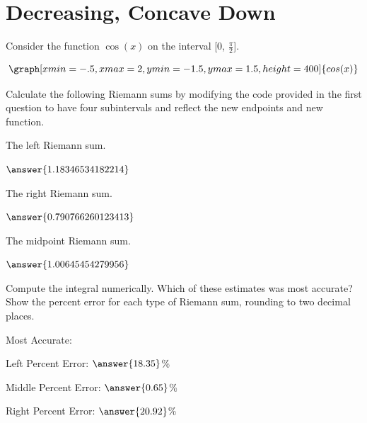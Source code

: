 \documentclass{ximera}
\begin{document}
\section{Decreasing, Concave Down}
\begin{question}
Consider the function $\cos(x)$ on the interval [0, $\frac{\pi}{2}$].

\[
\graph[xmin=-.5,xmax=2,ymin=-1.5,ymax=1.5,height=400]{cos(x)}
\]

Calculate the following Riemann sums by modifying the code provided in the first question to have four subintervals and reflect the new endpoints and new function.

The left Riemann sum.

\begin{onlineOnly}
\begin{sageCell}

\end{sageCell}
\end{onlineOnly}

$\answer{1.18346534182214}$

The right Riemann sum.

\begin{onlineOnly}
\begin{sageCell}

\end{sageCell}
\end{onlineOnly}

$\answer{0.790766260123413}$

The midpoint Riemann sum.

\begin{onlineOnly}
\begin{sageCell}

\end{sageCell}
\end{onlineOnly}

$\answer{1.00645454279956}$

Compute the integral numerically. Which of these estimates was most accurate? Show the percent error for each type of Riemann sum, rounding to two decimal places.

\begin{onlineOnly}
\begin{sageCell}

\end{sageCell}
\end{onlineOnly}

Most Accurate:
\begin{multipleChoice}
\end{multipleChoice}
Left Percent Error: $\answer{18.35}$\%

Middle Percent Error: $\answer{0.65}$\%

Right Percent Error: $\answer{20.92}$\%
\end{question}
\end{document}
